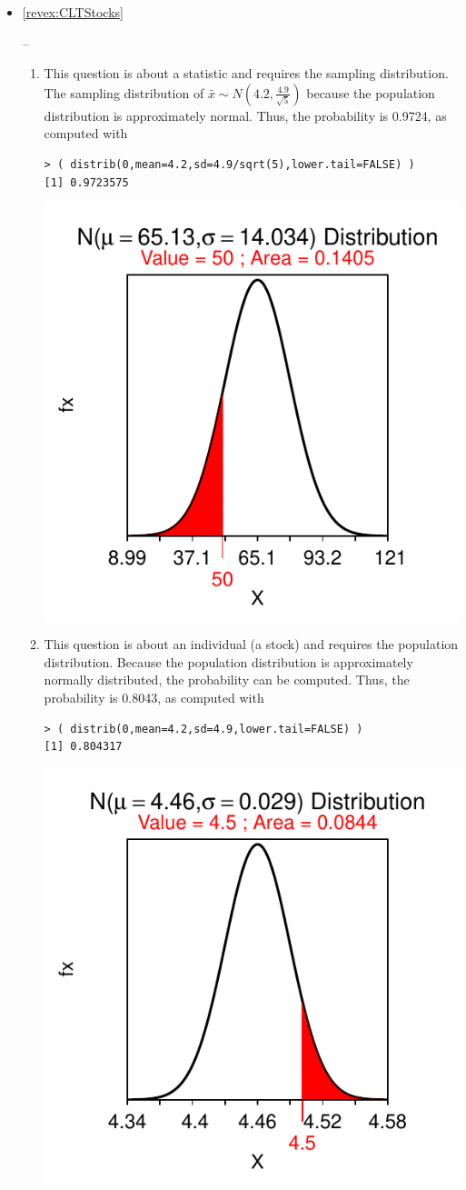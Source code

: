 \documentclass[10pt,openany]{book}\usepackage[]{graphicx}\usepackage[]{color}
\makeatletter
\newenvironment{kframe}{%
 \def\at@end@of@kframe{}%
 \ifinner\ifhmode%
  \def\at@end@of@kframe{\end{minipage}}%
  \begin{minipage}{\columnwidth}%
 \fi\fi%
 \def\FrameCommand##1{\hskip\@totalleftmargin \hskip-\fboxsep
 \colorbox{shadecolor}{##1}\hskip-\fboxsep
     \hskip-\linewidth \hskip-\@totalleftmargin \hskip\columnwidth}%
 \MakeFramed {\advance\hsize-\width
   \@totalleftmargin\z@ \linewidth\hsize
   \@setminipage}}%
 {\par\unskip\endMakeFramed%
 \at@end@of@kframe}
\newenvironment{knitrout}{}{} %
\makeatother
\begin{document}
\begin{itemize}
\begin{enumerate}
\begin{knitrout}
\end{knitrout}
    \end{enumerate}
  \item \hypertarget{ans:CLTStocks}{\ref{revex:CLTStocks}} --
    \begin{enumerate}
       \item This question is about a statistic and requires the sampling distribution.  The sampling distribution of $\bar{x}\sim N(4.2,\frac{4.9}{\sqrt{5}})$ because the population distribution is approximately normal.  Thus, the probability is 0.9724, as computed with
\begin{knitrout}
\color{fgcolor}\begin{kframe}
\begin{verbatim}
> ( distrib(0,mean=4.2,sd=4.9/sqrt(5),lower.tail=FALSE) )
[1] 0.9723575
\end{verbatim}
\end{kframe}

{\centering \includegraphics[width=.4\linewidth]{Figs/unnamed-chunk-321-1} 

}



\end{knitrout}
       \item This question is about an individual (a stock) and requires the population distribution. Because the population distribution is approximately normally distributed, the probability can be computed.  Thus, the probability is 0.8043, as computed with
\begin{knitrout}
\color{fgcolor}\begin{kframe}
\begin{verbatim}
> ( distrib(0,mean=4.2,sd=4.9,lower.tail=FALSE) )
[1] 0.804317
\end{verbatim}
\end{kframe}

{\centering \includegraphics[width=.4\linewidth]{Figs/unnamed-chunk-322-1} 

}
\end{knitrout}
\end{enumerate}
\end{itemize}
\end{document}

